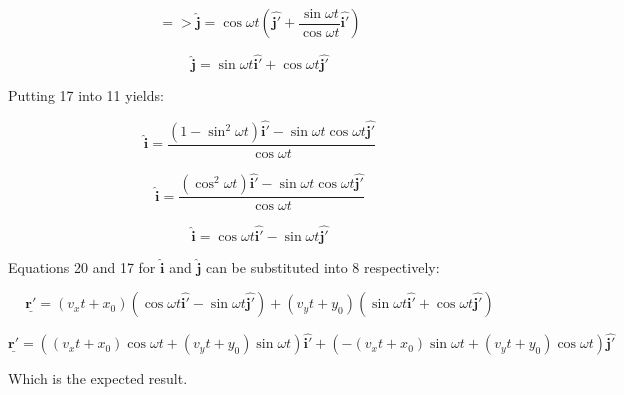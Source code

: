 \documentclass[a4paper,11pt]{scrartcl}
\begin{document}
\begin{equation}
=>\hat{\mathbf{j}}=\cos{\omega}t\left(\hat{\mathbf{j'}} +\frac{\sin{\omega}t }{\cos{\omega}t}\hat{\mathbf{i'}}\right)
\end{equation}

\begin{equation}
\hat{\mathbf{j}}=\sin{\omega}t\hat{\mathbf{i'}} +\cos{\omega}t\hat{\mathbf{j'}} 
\end{equation}

Putting 17 into 11 yields: 

\begin{equation}
\hat{\mathbf{i}} =\frac{(1-\sin^2{\omega}t)\hat{\mathbf{i'}} -\sin{\omega}t\cos{\omega}t\hat{\mathbf{j'}} }{ \cos{\omega}t}
\end{equation}

\begin{equation}
\hat{\mathbf{i}} =\frac{(\cos^2{\omega}t)\hat{\mathbf{i'}} -\sin{\omega}t\cos{\omega}t\hat{\mathbf{j'}} }{ \cos{\omega}t}
\end{equation}

\begin{equation}
\hat{\mathbf{i}} =\cos{\omega}t\hat{\mathbf{i'}} -\sin{\omega}t\hat{\mathbf{j'}} 
\end{equation}

Equations 20 and 17 for $\hat{\mathbf{i}}$ and $\hat{\mathbf{j}}$ can be substituted into 8 respectively:

\begin{equation}
\underline{\mathbf{r'}}=(v_xt+x_0)(\cos{\omega}t\hat{\mathbf{i'}} - \sin{\omega}t\hat{\mathbf{j'}}) +\left(v_yt+y_0\right)(\sin{\omega}t\hat{\mathbf{i'}} +\cos{\omega}t\hat{\mathbf{j'}} )
\end{equation}

\begin{equation}
\underline{\mathbf{r'}}=((v_xt+x_0)\cos{\omega}t+\left(v_yt+y_0\right)\sin{\omega}t)\hat{\mathbf{i'}} + (-(v_xt+x_0)\sin{\omega}t +\left(v_yt+y_0\right)\cos{\omega}t)\hat{\mathbf{j'}} 
\end{equation}

Which is the expected result. 
\end{document}
